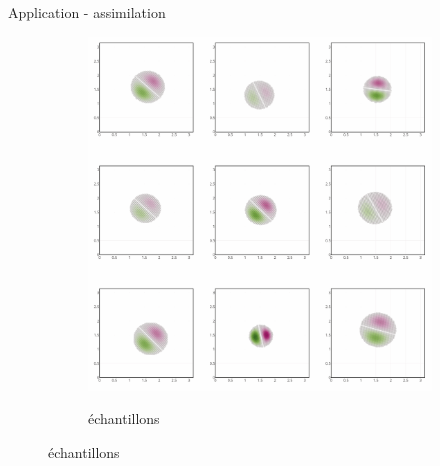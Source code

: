 \documentclass[aspectratio=169]{beamer} %
\begin{document}
\begin{frame}{Application - assimilation}
\begin{figure}[t]
\begin{subfigure}{0.3\textwidth}
            {\includegraphics[height=0.3\textheight]{../../conference/images/dipole_estimate/ensemble_sample/ensemble_sample-0.png}}
            \caption*{\tiny échantillons}
        \end{subfigure}
        \hfill
    \end{figure}
\end{frame}
\end{document}
